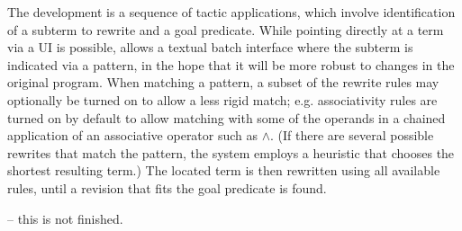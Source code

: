 The development is a sequence of tactic applications, which involve
identification of a subterm to rewrite and a goal predicate.
While pointing directly at a term via a UI is possible,
\TransCal allows a textual batch interface where the subterm is
indicated via a pattern, in the hope that it will be more robust
to changes in the original program.
When matching a pattern, a subset of the rewrite rules may optionally
be turned on to allow a less rigid match; e.g. associativity rules are
turned on by default to allow matching with some of the operands in
a chained application of an associative operator such as $\land$.
(If there are several possible rewrites that match the pattern,
the system employs a heuristic that chooses the shortest resulting term.)
The located term is then rewritten using all available rules,
until a revision that fits the goal predicate is found.

-- this is not finished.

